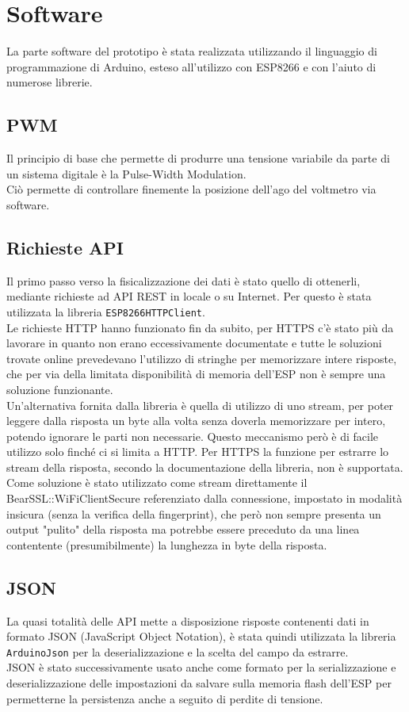 \documentclass[12pt,a4paper]{report}
\begin{document}
\section{Software}
La parte software del prototipo è stata realizzata utilizzando il linguaggio di programmazione di Arduino, esteso all'utilizzo con
ESP8266 e con l'aiuto di numerose librerie.

\subsection{PWM}
Il principio di base che permette di produrre una tensione variabile da parte di un sistema digitale è la Pulse-Width Modulation.\\
Ciò permette di controllare finemente la posizione dell'ago del voltmetro via software.

\subsection{Richieste API}
Il primo passo verso la fisicalizzazione dei dati è stato quello di ottenerli, mediante richieste ad API REST in locale o su Internet.
Per questo è stata utilizzata la libreria \texttt{ESP8266HTTPClient}.\\
Le richieste HTTP hanno funzionato fin da subito, per HTTPS c'è stato più da lavorare in quanto non erano eccessivamente
documentate e tutte le soluzioni trovate online prevedevano l'utilizzo di stringhe per memorizzare intere risposte, che per via
della limitata disponibilità di memoria dell'ESP non è sempre una soluzione funzionante.\\
Un'alternativa fornita dalla libreria è quella di utilizzo di uno stream, per poter leggere dalla risposta un byte alla volta senza doverla
memorizzare per intero, potendo ignorare le parti non necessarie. Questo meccanismo però è di facile utilizzo solo finché ci si limita a
HTTP. Per HTTPS la funzione per estrarre lo stream della risposta, secondo la documentazione della libreria, non è supportata.
Come soluzione è stato utilizzato come stream direttamente il BearSSL::WiFiClientSecure referenziato dalla connessione, impostato in
modalità insicura (senza la verifica della fingerprint), che però non sempre presenta un output "pulito" della risposta ma potrebbe essere
preceduto da una linea contentente (presumibilmente) la lunghezza in byte della risposta.

\subsection{JSON}
La quasi totalità delle API mette a disposizione risposte contenenti dati in formato JSON (JavaScript Object Notation), è stata quindi
utilizzata la libreria \texttt{ArduinoJson} per la deserializzazione e la scelta del campo da estrarre.\\
JSON è stato successivamente usato anche come formato per la serializzazione e deserializzazione delle impostazioni da salvare sulla
memoria flash dell'ESP per permetterne la persistenza anche a seguito di perdite di tensione.
\end{document}
